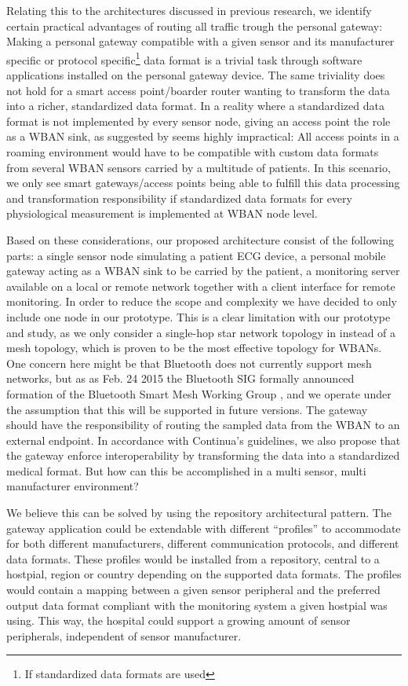 Relating this to the architectures discussed in previous research, we identify certain practical advantages of routing all traffic trough the personal gateway: Making a personal gateway compatible with a given sensor and its manufacturer specific or protocol specific\footnote{ If standardized data formats are used} data format is a trivial task through software applications installed on the personal gateway device. The same triviality does not hold for a smart access point/boarder router wanting to transform the data into a richer, standardized data format. In a reality where a standardized data format is not implemented by every sensor node, giving an access point the role as a WBAN sink, as suggested by \cite{DrAmirMohammadRahmani:2014vx} seems highly impractical: All access points in a roaming environment would have to be compatible with custom data formats from several WBAN sensors carried by a multitude of patients. In this scenario, we only see smart gateways/access points being able to fulfill this data processing and transformation responsibility if standardized data formats for every physiological measurement is implemented at WBAN node level.

Based on these considerations, our proposed architecture consist of the following parts: a single sensor node simulating a patient ECG device, a personal mobile gateway acting as a WBAN sink to be carried by the patient, a monitoring server available on a local or remote network together with a client interface for remote monitoring. In order to reduce the scope and complexity we have decided to only include one node in our prototype. This is a clear limitation with our prototype and study, as we only consider a single-hop star network topology in instead of a mesh topology, which is proven to be the most effective topology for WBANs. One concern here might be that Bluetooth does not currently support mesh networks, but as as Feb. 24 2015 the Bluetooth SIG formally announced formation of the Bluetooth Smart Mesh Working Group \cite{bt:sig:mesh}, and we operate under the assumption that this will be supported in future versions. The gateway should have the responsibility of routing the sampled data from the WBAN to an external endpoint. In accordance with Continua's guidelines, we also propose that the gateway enforce interoperability by transforming the data into a standardized medical format. But how can this be accomplished in a multi sensor, multi manufacturer environment? 

We believe this can be solved by using the repository architectural pattern. The gateway application could be extendable with different ``profiles'' to accommodate for both different manufacturers,  different communication protocols, and different data formats. These profiles would be installed from a repository, central to a hostpial, region or country depending on the supported data formats. The profiles would contain a mapping between a given sensor peripheral and the preferred output data format compliant with the monitoring system a given hostpial was using. This way, the hospital could support a growing amount of sensor peripherals, independent of sensor manufacturer.

